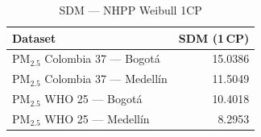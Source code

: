 \begin{table}[htbp]
\centering
\caption{SDM --- NHPP Weibull 1CP}
\label{tab:nhpp_sdm_1cp}
\begin{tabular}{lr}
\toprule
Dataset & SDM (1\,CP) \\
\midrule
PM$_{2.5}$ Colombia 37 --- Bogot\'{a} & 15.0386 \\
PM$_{2.5}$ Colombia 37 --- Medell\'{i}n & 11.5049 \\
PM$_{2.5}$ WHO 25 --- Bogot\'{a} & 10.4018 \\
PM$_{2.5}$ WHO 25 --- Medell\'{i}n & 8.2953 \\
\bottomrule
\end{tabular}
\end{table}
